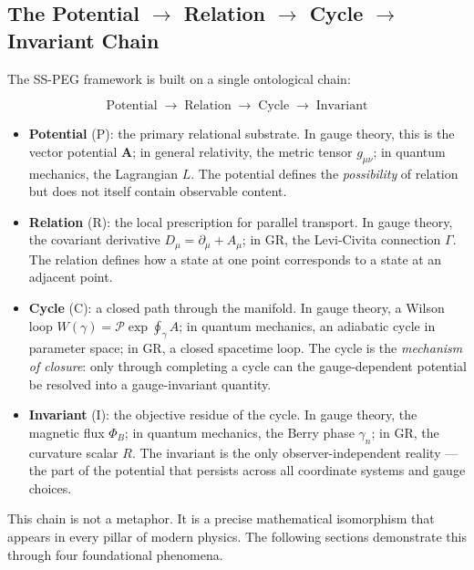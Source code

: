 \subsection{The Potential $\to$ Relation $\to$ Cycle $\to$ Invariant Chain}\label{sec:prci_chain}

The SS-PEG framework is built on a single ontological chain:

\begin{equation}
\text{Potential} \;\to\; \text{Relation} \;\to\; \text{Cycle} \;\to\; \text{Invariant}
\end{equation}

\begin{itemize}
\item \textbf{Potential} (P): the primary relational substrate. In gauge theory, this is the vector potential $\mathbf{A}$; in general relativity, the metric tensor $g_{\mu\nu}$; in quantum mechanics, the Lagrangian $L$. The potential defines the \textit{possibility} of relation but does not itself contain observable content.

\item \textbf{Relation} (R): the local prescription for parallel transport. In gauge theory, the covariant derivative $D_\mu = \partial_\mu + A_\mu$; in GR, the Levi-Civita connection $\Gamma$. The relation defines how a state at one point corresponds to a state at an adjacent point.

\item \textbf{Cycle} (C): a closed path through the manifold. In gauge theory, a Wilson loop $W(\gamma) = \mathcal{P}\exp\oint_\gamma A$; in quantum mechanics, an adiabatic cycle in parameter space; in GR, a closed spacetime loop. The cycle is the \textit{mechanism of closure}: only through completing a cycle can the gauge-dependent potential be resolved into a gauge-invariant quantity.

\item \textbf{Invariant} (I): the objective residue of the cycle. In gauge theory, the magnetic flux $\Phi_B$; in quantum mechanics, the Berry phase $\gamma_n$; in GR, the curvature scalar $R$. The invariant is the only observer-independent reality --- the part of the potential that persists across all coordinate systems and gauge choices.
\end{itemize}

This chain is not a metaphor. It is a precise mathematical isomorphism that appears in every pillar of modern physics. The following sections demonstrate this through four foundational phenomena.

